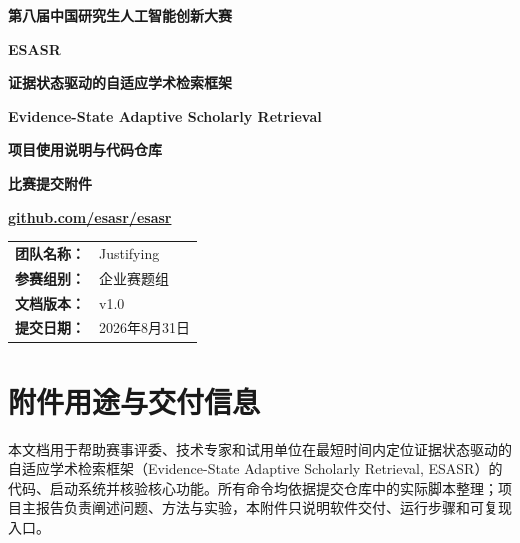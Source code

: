 \documentclass[a4paper,11pt,fontset=none]{ctexart}
\newcommand{\repo}{\href{https://github.com/esasr/esasr}{github.com/esasr/esasr}}
\begin{document}
\color{black}
\thispagestyle{empty}
\begin{center}
  \vspace*{1.2cm}
  {\fontsize{22pt}{30pt}\selectfont\bfseries 第八届中国研究生人工智能创新大赛\par}
  \vspace{2.3cm}
  {\fontsize{30pt}{38pt}\selectfont\bfseries\color{DeepBlue} ESASR\par}
  \vspace{0.4cm}
  {\bfseries 证据状态驱动的自适应学术检索框架\par}
  \vspace{0.25cm}
  {\bfseries Evidence-State Adaptive Scholarly Retrieval\par}
  \vspace{1.0cm}
  {\bfseries 项目使用说明与代码仓库\par}
  \vspace{0.35cm}
  {\color{AccentRed}\bfseries 比赛提交附件\par}
  \vspace{1.1cm}
  \vspace{0.45cm}

  {\large\bfseries\repo\par}
  \vfill
  \begin{tabular}{rl}
    \textbf{团队名称：} & Justifying \\
    \textbf{参赛组别：} & 企业赛题组 \\
    \textbf{文档版本：} & v1.0 \\
    \textbf{提交日期：} & 2026年8月31日 \\
  \end{tabular}
  \vspace{1.0cm}
\end{center}

\newpage
\thispagestyle{plain}
{\small\tableofcontents}
\newpage
{}

\section{附件用途与交付信息}

本文档用于帮助赛事评委、技术专家和试用单位在最短时间内定位证据状态驱动的自适应学术检索框架（Evidence-State Adaptive Scholarly Retrieval, ESASR）的代码、启动系统并核验核心功能。所有命令均依据提交仓库中的实际脚本整理；项目主报告负责阐述问题、方法与实验，本附件只说明软件交付、运行步骤和可复现入口。
\end{document}
